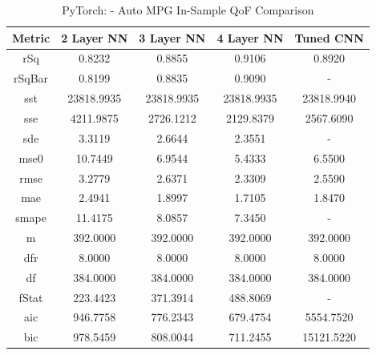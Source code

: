 \documentclass{article}
\begin{document}
\begin{table}[H]
\centering
\caption{PyTorch: - Auto MPG In-Sample QoF Comparison}
\label{tab:PyTorch: - Auto MPG In-Sample QoF Comparison}
\begin{tabular}{|c|c|c|c|c|} \hline
Metric & 2 Layer NN & 3 Layer NN & 4 Layer NN & Tuned CNN \\ \hline \hline
rSq & 0.8232 & 0.8855 & 0.9106 & 0.8920 \\ \hline
rSqBar & 0.8199 & 0.8835 & 0.9090 & - \\ \hline
sst & 23818.9935 & 23818.9935 & 23818.9935 & 23818.9940 \\ \hline
sse & 4211.9875 & 2726.1212 & 2129.8379 & 2567.6090 \\ \hline
sde & 3.3119 & 2.6644 & 2.3551 & - \\ \hline
mse0 & 10.7449 & 6.9544 & 5.4333 & 6.5500 \\ \hline
rmse & 3.2779 & 2.6371 & 2.3309 & 2.5590 \\ \hline
mae & 2.4941 & 1.8997 & 1.7105 & 1.8470 \\ \hline
smape & 11.4175 & 8.0857 & 7.3450 & - \\ \hline
m & 392.0000 & 392.0000 & 392.0000 & 392.0000 \\ \hline
dfr & 8.0000 & 8.0000 & 8.0000 & 8.0000 \\ \hline
df & 384.0000 & 384.0000 & 384.0000 & 384.0000 \\ \hline
fStat & 223.4423 & 371.3914 & 488.8069 & - \\ \hline
aic & 946.7758 & 776.2343 & 679.4754 & 5554.7520 \\ \hline
bic & 978.5459 & 808.0044 & 711.2455 & 15121.5220 \\ \hline
\end{tabular}
\end{table}
\end{document}
